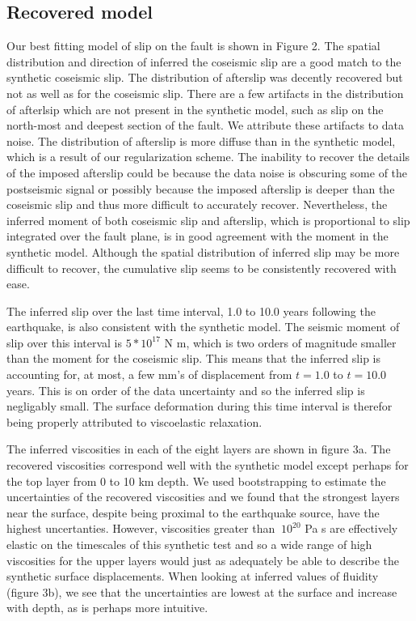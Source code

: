 \documentclass[extra]{gji}
\begin{document}
\subsection{Recovered model}

Our best fitting model of slip on the fault is shown in Figure 2.  The
spatial distribution and direction of inferred the coseismic slip are
a good match to the synthetic coseismic slip.  The distribution of
afterslip was decently recovered but not as well as for the coseismic
slip.  There are a few artifacts in the distribution of afterlsip
which are not present in the synthetic model, such as slip on the
north-most and deepest section of the fault.  We attribute these
artifacts to data noise.  The distribution of afterslip is more
diffuse than in the synthetic model, which is a result of our
regularization scheme.  The inability to recover the details of the
imposed afterslip could be because the data noise is obscuring some of
the postseismic signal or possibly because the imposed afterslip is
deeper than the coseismic slip and thus more difficult to accurately
recover.  Nevertheless, the inferred moment of both coseismic slip and
afterslip, which is proportional to slip integrated over the fault
plane, is in good agreement with the moment in the synthetic model.
Although the spatial distribution of inferred slip may be more
difficult to recover, the cumulative slip seems to be consistently
recovered with ease.

The inferred slip over the last time interval, 1.0 to 10.0 years
following the earthquake, is also consistent with the synthetic model.
The seismic moment of slip over this interval is $5*10^{17}$ N m,
which is two orders of magnitude smaller than the moment for the
coseismic slip.  This means that the inferred slip is accounting for,
at most, a few mm's of displacement from $t=1.0$ to $t=10.0$ years.
This is on order of the data uncertainty and so the inferred slip is
negligably small.  The surface deformation during this time interval
is therefor being properly attributed to viscoelastic relaxation.

The inferred viscosities in each of the eight layers are shown in
figure 3a.  The recovered viscosities correspond well with the
synthetic model except perhaps for the top layer from 0 to 10 km
depth.  We used bootstrapping to estimate the uncertainties of the
recovered viscosities and we found that the strongest layers near the
surface, despite being proximal to the earthquake source, have the
highest uncertanties.  However, viscosities greater than $~10^{20}$ Pa s are
effectively elastic on the timescales of this synthetic test and so a
wide range of high viscosities for the upper layers would just as
adequately be able to describe the synthetic surface displacements.
When looking at inferred values of fluidity (figure 3b), we see that
the uncertainties are lowest at the surface and increase with depth,
as is perhaps more intuitive.
\end{document}
